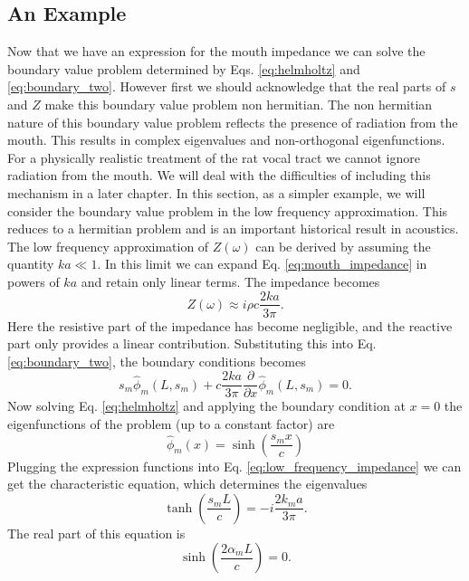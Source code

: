 \documentclass[12pt, letter]{report}
\begin{document}
\subsection{An Example}
Now that we have an expression for the mouth impedance we can solve the boundary value problem determined by Eqs. \ref{eq:helmholtz} and \ref{eq:boundary_two}. However first we should acknowledge that the real parts of $s$ and $Z$ make this boundary value problem non hermitian. The non hermitian nature of this boundary value problem reflects the presence of radiation from the mouth. This results in complex eigenvalues and non-orthogonal eigenfunctions. For a physically realistic treatment of the rat vocal tract we cannot ignore radiation from the mouth. We will deal with the difficulties of including this mechanism in a later chapter. In this section, as a simpler example, we will consider the boundary value problem in the low frequency approximation. This reduces to a hermitian problem and is an important historical result in acoustics. The low frequency approximation of $Z(\omega)$ can be derived by assuming the quantity $ka \ll 1$. In this limit we can expand Eq. \ref{eq:mouth_impedance} in powers of $ka$ and retain only linear terms. The impedance becomes
\begin{equation}
Z(\omega) \approx i \rho c  \frac{2 k a}{3\pi}.
\end{equation}
Here the resistive part of the impedance has become negligible, and the reactive part only provides a linear contribution. Substituting this into Eq. \ref{eq:boundary_two}, the boundary conditions becomes
\begin{equation}
\label{eq:low_frequency_impedance}
s_m \hat{\phi}_m(L, s_m) + c \frac{2ka}{3\pi} \frac{\partial }{\partial x}\hat{\phi}_m(L, s_m)= 0.
\end{equation}
Now solving Eq. \ref{eq:helmholtz} and applying the boundary condition at $x=0$ the eigenfunctions of the problem (up to a constant factor) are 
\begin{equation}
\label{eq:resonance_modes}
\hat{\phi}_m(x)= \sinh \left(\frac{s_m x}{c} \right)
\end{equation}
Plugging the expression functions into Eq. \ref{eq:low_frequency_impedance} we can get the characteristic equation, which determines the eigenvalues
\begin{equation}
\label{eq:characteristic1}
\tanh \left( \frac{s_m L}{c} \right) = -i \frac{2 k_m a}{3 \pi}.
\end{equation}
The real part of this equation is
\begin{equation}
\sinh \left(\frac{2 \alpha_m L}{c} \right) = 0. 
\end{equation}
\end{document}
